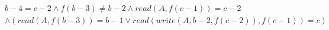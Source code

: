 \begin{align*}
%
& %
b - 4 = c - 2
%
\land
%
f(b - 3)  \neq  b - 2
%
\land
%
\mathit{read}(A,f(c - 1)) = c - 2
~\\~
& %
%
\land
%
(\mathit{read}(A,f(b - 3)) = b - 1 \lor \mathit{read}(\mathit{write}(A,b - 2,f(c - 2)),f(c - 1)) = c)
%
\end{align*}
